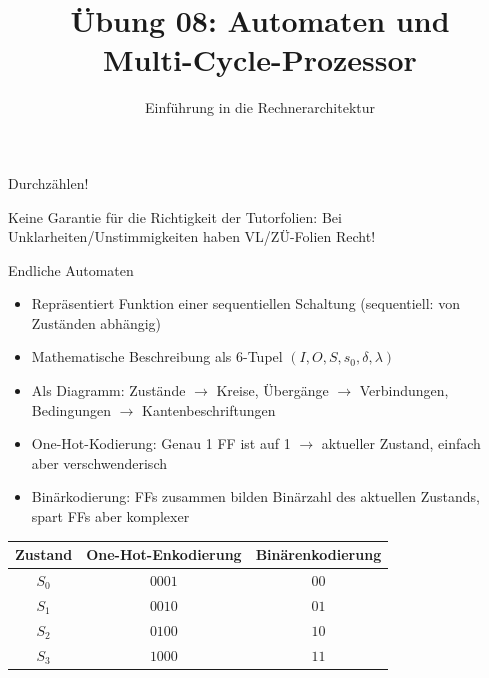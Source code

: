 

\title{Übung 08: Automaten und \\Multi-Cycle-Prozessor}
\subtitle{Einführung in die Rechnerarchitektur}
\date{}



\maketitle

\begin{frame}[c]{}{}
	\begin{center}
		\LARGE  Durchzählen!
	\end{center}
\end{frame}

\begin{frame}[c]{}{}
	\begin{center}
		\LARGE  Keine Garantie für die Richtigkeit der Tutorfolien: Bei Unklarheiten/Unstimmigkeiten
		haben VL/ZÜ-Folien Recht!
	\end{center}
\end{frame}

\begin{frame}[fragile, c]{Endliche Automaten}{}
	\begin{itemize}
		\item Repräsentiert Funktion einer sequentiellen Schaltung (sequentiell: von Zuständen abhängig)
		\item Mathematische Beschreibung als 6-Tupel $(I, O, S, s_0, \delta, \lambda)$
		\item Als Diagramm: Zustände $\rightarrow$ Kreise, Übergänge $\rightarrow$ Verbindungen, Bedingungen $\rightarrow$ Kantenbeschriftungen
		\item One-Hot-Kodierung: Genau 1 FF ist auf 1 $\rightarrow$ aktueller Zustand, einfach aber verschwenderisch
		\item Binärkodierung: FFs zusammen bilden Binärzahl des aktuellen Zustands, spart FFs aber komplexer
	\end{itemize}
	\begin{table}[]
		\begin{tabular}{c|c|c}
			Zustand & One-Hot-Enkodierung & Binärenkodierung \\ \hline
			$S_0$   & $0001$              & $00$             \\
			$S_1$   & $0010$              & $01$             \\
			$S_2$   & $0100$              & $10$             \\
			$S_3$   & $1000$              & $11$
		\end{tabular}
	\end{table}
\end{frame}

